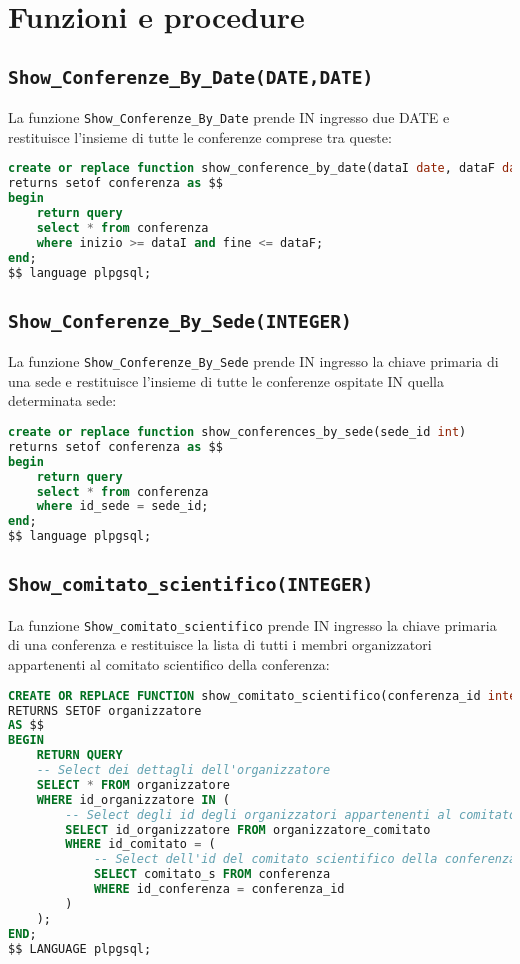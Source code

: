 \section{Funzioni e procedure}
\subsection{\texttt{Show\_Conferenze\_By\_Date(DATE,DATE)}}
La funzione \texttt{Show\_Conferenze\_By\_Date} prende IN ingresso due DATE e restituisce l'insieme di tutte le conferenze comprese tra queste:
\begin{lstlisting}[language=SQL, style=mystyle]
create or replace function show_conference_by_date(dataI date, dataF date)
returns setof conferenza as $$
begin
    return query
    select * from conferenza
    where inizio >= dataI and fine <= dataF;
end;
$$ language plpgsql;
\end{lstlisting}
\subsection{\texttt{Show\_Conferenze\_By\_Sede(INTEGER)}}
La funzione \texttt{Show\_Conferenze\_By\_Sede} prende IN ingresso la chiave primaria di una sede e restituisce l'insieme di tutte le conferenze ospitate IN quella determinata sede:
\begin{lstlisting}[language=SQL, style=mystyle]
create or replace function show_conferences_by_sede(sede_id int)
returns setof conferenza as $$
begin
    return query
    select * from conferenza
    where id_sede = sede_id;
end;
$$ language plpgsql;
\end{lstlisting}
\subsection{\texttt{Show\_comitato\_scientifico(INTEGER)}}
La funzione \texttt{Show\_comitato\_scientifico} prende IN ingresso la chiave primaria di una conferenza e restituisce la lista di tutti i membri organizzatori appartenenti al comitato scientifico della conferenza:
\begin{lstlisting}[language=SQL, style=mystyle]
CREATE OR REPLACE FUNCTION show_comitato_scientifico(conferenza_id integer)
RETURNS SETOF organizzatore
AS $$
BEGIN
    RETURN QUERY
    -- Select dei dettagli dell'organizzatore
    SELECT * FROM organizzatore
    WHERE id_organizzatore IN (
        -- Select degli id degli organizzatori appartenenti al comitato scientifico
        SELECT id_organizzatore FROM organizzatore_comitato
        WHERE id_comitato = (
            -- Select dell'id del comitato scientifico della conferenza
            SELECT comitato_s FROM conferenza
            WHERE id_conferenza = conferenza_id
        )
    );
END;
$$ LANGUAGE plpgsql;
\end{lstlisting}
